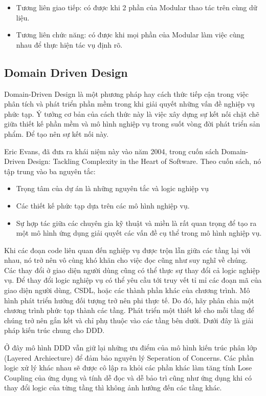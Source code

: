 \begin{itemize}
	\item Tương liên giao tiếp: có được khi 2 phần của Modular thao tác trên cùng dữ liệu.
	\item Tương liên chức năng: có được khi mọi phần của Modular làm việc cùng nhau để thực hiện tác vụ định rõ.
\end{itemize}

\subsection{Domain Driven Design}

Domain-Driven Design là một phương pháp hay cách thức tiếp cận trong việc phân tích và phát triển phần mềm trong khi giải quyết những vấn đề nghiệp vụ phức tạp. Ý tưởng cơ bản của cách thức này là việc xây dựng sự kết nối chặt chẽ giữa thiết kế phần mềm và mô hình nghiệp vụ trong suốt vòng đời phát triển sản phẩm. Để tạo nên sự kết nối này.

Eric Evans, đã đưa ra khái niệm này vào năm 2004, trong cuốn sách Domain-Driven Design: Tackling Complexity in the Heart of Software. Theo cuốn sách, nó tập trung vào ba nguyên tắc:

\begin{itemize}
	\item Trọng tâm của dự án là những nguyên tắc và logic nghiệp vụ
	\item Các thiết kế phức tạp dựa trên các mô hình nghiệp vụ.
	\item Sự hợp tác giữa các chuyên gia kỹ thuật và miền là rất quan trọng để tạo ra một mô hình ứng dụng giải quyết các vấn đề cụ thể trong mô hình nghiệp vụ.
\end{itemize}

Khi các đoạn code liên quan đến nghiệp vụ được trộn lẫn giữa các tầng lại với nhau, nó trở nên vô cùng khó khăn cho việc đọc cũng như suy nghĩ về chúng. Các thay đổi ở giao diện người dùng cũng có thể thực sự thay đổi cả logic nghiệp vụ. Để thay đổi logic nghiệp vụ có thể yêu cầu tới truy vết tỉ mỉ các đoạn mã của giao diện người dùng, CSDL, hoặc các thành phần khác của chương trình. Mô hình phát triển hướng đối tượng trở nên phi thực tế. Do đó, hãy phân chia một chương trình phức tạp thành các tầng. Phát triển một thiết kế cho mỗi tầng để chúng trở nên gắn kết và chỉ phụ thuộc vào các tầng bên dưới. Dưới đây là giải pháp kiến trúc chung cho DDD.

Ở đây mô hình DDD vẫn giữ lại những ưu điểm của mô hình kiến trúc phân lớp (Layered Archiecture) để đảm bảo nguyên lý Seperation of Concerns. Các phần logic xử lý khác nhau sẽ được cô lập ra khỏi các phần khác làm tăng tính Lose Coupling của ứng dụng và tính dễ đọc và dễ bảo trì cũng như ứng dụng khi có thay đổi logic của từng tầng thì không ảnh hướng đến các tầng khác.

